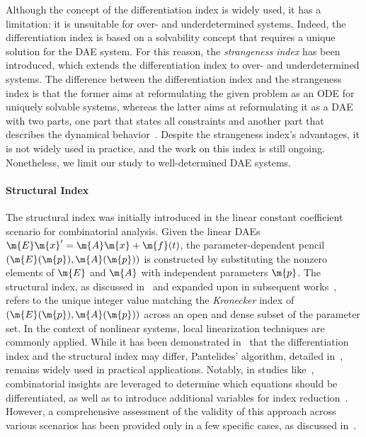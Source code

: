 Although the concept of the differentiation index is widely used, it has a limitation: it is unsuitable for over- and underdetermined systems. Indeed, the differentiation index is based on a solvability concept that requires a unique solution for the \ac{DAE} system. For this reason, the \emph{strangeness index} has been introduced, which extends the differentiation index to over- and underdetermined systems. The difference between the differentiation index and the strangeness index is that the former aims at reformulating the given problem as an \ac{ODE} for uniquely solvable systems, whereas the latter aims at reformulating it as a \ac{DAE} with two parts, one part that states all constraints and another part that describes the dynamical behavior~\cite{mehrmann2015index}. Despite the strangeness index's advantages, it is not widely used in practice, and the work on this index is still ongoing. Nonetheless, we limit our study to well-determined \ac{DAE} systems.

\paragraph{Structural Index}

The structural index was initially introduced in the linear constant coefficient scenario for combinatorial analysis. Given the linear \acp{DAE} $\m{E}\m{x}^{\prime} = \m{A}\m{x} + \m{f}(t)$, the parameter-dependent pencil $(\m{E}(\m{p}), \m{A}(\m{p}))$ is constructed by substituting the nonzero elements of $\m{E}$ and $\m{A}$ with independent parameters $\m{p}$. The structural index, as discussed in~\cite{pantelides1988consistent, pryce2001simple} and expanded upon in subsequent works~\cite{benveniste2021structural}, refers to the unique integer value matching the \emph{Kronecker} index of $(\m{E}(\m{p}), \m{A}(\m{p}))$ across an open and dense subset of the parameter set. In the context of nonlinear systems, local linearization techniques are commonly applied. While it has been demonstrated in~\cite{reissig2000differential} that the differentiation index and the structural index may differ, Pantelides' algorithm, detailed in~\cite{pantelides1988consistent}, remains widely used in practical applications. Notably, in studies like~\cite{unger1995structural}, combinatorial insights are leveraged to determine which equations should be differentiated, as well as to introduce additional variables for index reduction~\cite{mattsson1993index}. However, a comprehensive assessment of the validity of this approach across various scenarios has been provided only in a few specific cases, as discussed in~\cite{mehrmann2015index}.

